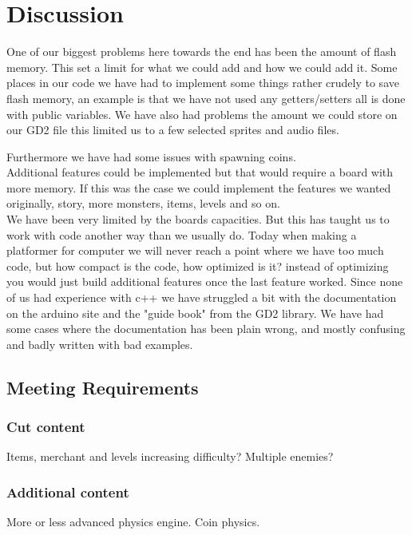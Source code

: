 \chapter{Discussion}
 
One of our biggest problems here towards the end has been the amount of flash memory. This set a limit for what we could add and how we could add it. Some places in our code we have had to implement some things rather crudely to save flash memory, an example is that we have not used any getters/setters all is done with public variables. We have also had problems the amount we could store on our GD2 file this limited us to a few selected sprites and audio files.

Furthermore we have had some issues with spawning coins.\\

Additional features could be implemented but that would require a board with more memory. If this was the case we could implement the features we wanted originally, story, more monsters, items, levels and so on.\\
We have been very limited by the boards capacities. But this has taught us to work with code another way than we usually do. Today when making a platformer for computer we will never reach a point where we have too much code, but how compact is the code, how optimized is it? instead of optimizing you would just build additional features once the last feature worked. Since none of us had experience with c++ we have struggled a bit with the documentation on the arduino site and the "guide book" from the GD2 library. We have had some cases where the documentation has been plain wrong, and mostly confusing and badly written with bad examples.


\section{Meeting Requirements}

\subsection*{Cut content}
Items, merchant and levels
increasing difficulty?
Multiple enemies?
\subsection*{Additional content}
More or less advanced physics engine.
Coin physics.
